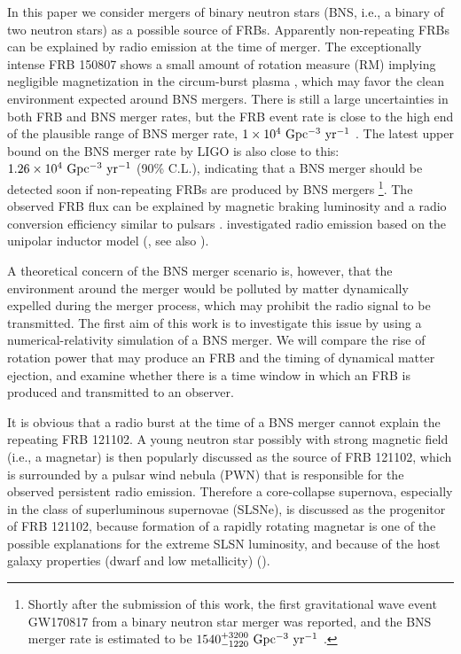 \documentclass[]{pasj01}
\begin{document}
In this paper we consider mergers of binary neutron stars (BNS, i.e.,
a binary of two neutron stars) as a possible source of
FRBs. Apparently non-repeating FRBs can be explained by radio emission
at the time of merger.  The exceptionally intense FRB 150807 shows a
small amount of rotation measure (RM) implying negligible
magnetization in the circum-burst plasma \citep{Ravi2016}, which may
favor the clean environment expected around BNS mergers. There is
still a large uncertainties in both FRB and BNS merger rates, but the
FRB event rate is close to the high end of the plausible range of BNS
merger rate, $1 \times 10^4 {\rm \ Gpc^{-3} \ yr^{-1}}$
\citep{Abadie2010}. The latest upper bound on the BNS merger rate by
LIGO \citep{Abbot2016} is also close to this: $1.26 \times 10^4 {\rm
  \ Gpc^{-3} \ yr^{-1}}$ (90\% C.L.), indicating that a BNS merger
should be detected soon if non-repeating FRBs are produced by BNS
mergers \footnote{Shortly after the submission of
    this work, the first gravitational wave event GW170817 from a
    binary neutron star merger was reported, and the BNS merger
rate is estimated to be 
$1540_{-1220}^{+3200} {\rm \ Gpc^{-3} \ yr^{-1}}$
\citep{Abbot2017a}.}. The observed FRB flux can be
explained by magnetic braking luminosity and a radio conversion
efficiency similar to pulsars \citep{Totani2013}.  \citet{Wang2016}
investigated radio emission based on the unipolar inductor model
(\cite{Piro2012,Lai2012}, see also \cite{Hansen2001}).

A theoretical concern of the BNS merger scenario is, however, that the
environment around the merger would be polluted by
matter dynamically expelled during the merger process, which may
prohibit the radio signal to be transmitted.  The first aim of this
work is to investigate this issue by using a numerical-relativity
simulation of a BNS merger. We will compare the rise of rotation power
that may produce an FRB and the timing of dynamical matter ejection, and
examine whether there is a time window in which an FRB is produced and
transmitted to an observer.

It is obvious that a radio burst at the time of a BNS merger cannot
explain the repeating FRB 121102. A young neutron star possibly with
strong magnetic field (i.e., a magnetar) is then popularly discussed
as the source of FRB 121102, which is surrounded by a pulsar wind
nebula (PWN) that is responsible for the observed persistent radio
emission. Therefore a core-collapse supernova, especially in the class
of superluminous supernovae (SLSNe), is discussed as the progenitor of
FRB 121102, because formation of a rapidly rotating magnetar is one of
the possible explanations for the extreme SLSN luminosity, and because
of the host galaxy properties (dwarf and low metallicity)
(\cite{Kashiyama&Murase2017,Metzger2017}).
\end{document}
